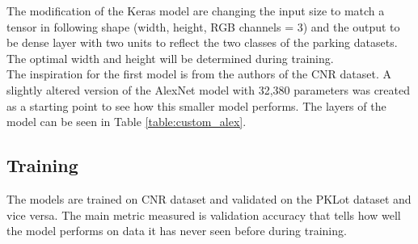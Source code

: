 \documentclass[thesis=M,english]{FITthesis}[2019/03/06]
\begin{document}
The modification of the Keras model are changing the input size to match a tensor in following shape (width, height, RGB channels = 3) and the output to be dense layer with two units to reflect the two classes of the parking datasets. The optimal width and height will be determined during training.\\

The inspiration for the first model is from the authors of the CNR dataset. A slightly altered version of the AlexNet model with 32,380 parameters was created as a starting point to see how this smaller model performs. The layers of the model can be seen in Table \ref{table:custom_alex}.\\

\subsection{Training}

The models are trained on CNR dataset and validated on the PKLot dataset and vice versa. The main metric measured is validation accuracy that tells how well the model performs on data it has never seen before during training. \\
\end{document}
